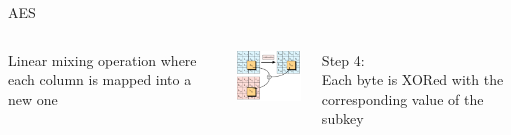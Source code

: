 \begin{frame}{AES}
\begin{columns}
\begin{column}{0.25\textwidth}
    Linear mixing operation where each column is mapped into a new one
  \end{column}
  \begin{column}{0.25\textwidth}
    \includegraphics[width=3.5cm]{img/AES-4.png}
  \end{column}
  \begin{column}{0.25\textwidth}
    Step 4: \\
    
    Each byte is XORed with the corresponding value of the subkey
  \end{column}
  \end{columns}

\end{frame}

